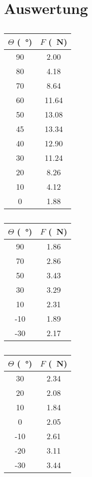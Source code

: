 \section{Auswertung}

\begin{table}[H]
    \begin{tabular}{cc}
        \toprule
        $\Theta$ (\SI{}{\degree}) & $F$ (\SI{}{\newton}) \\
        \midrule
        90 & 2.00  \\
        80 & 4.18  \\
        70 & 8.64  \\
        60 & 11.64 \\
        50 & 13.08 \\
        45 & 13.34 \\
        40 & 12.90 \\
        30 & 11.24 \\
        20 & 8.26  \\
        10 & 4.12  \\
        0  & 1.88  \\
        \bottomrule
    \end{tabular}
    \caption{}
\end{table}

\begin{table}[H]
    \begin{tabular}{cc}
        \toprule
        $\Theta$ (\SI{}{\degree}) & $F$ (\SI{}{\newton}) \\
        \midrule
         90 & 1.86 \\
         70 & 2.86 \\
         50 & 3.43 \\
         30 & 3.29 \\
         10 & 2.31 \\
        -10 & 1.89 \\
        -30 & 2.17 \\
        \bottomrule
    \end{tabular}
    \caption{}
\end{table}

\begin{table}[H]
    \begin{tabular}{cc}
        \toprule
        $\Theta$ (\SI{}{\degree}) & $F$ (\SI{}{\newton}) \\
        \midrule
         30 & 2.34 \\
         20 & 2.08 \\
         10 & 1.84 \\
         0  & 2.05 \\
        -10 & 2.61 \\
        -20 & 3.11 \\
        -30 & 3.44 \\
        \bottomrule
    \end{tabular}
    \caption{}
\end{table}

